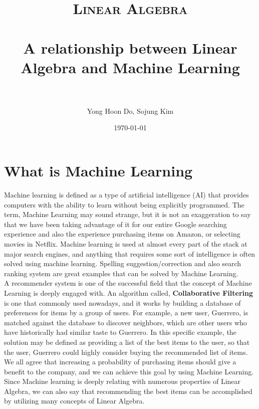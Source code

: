 \documentclass[paper=a4, fontsize=11pt]{scrartcl} %
\title{
\normalfont \normalsize
\textsc{Linear Algebra} \\ [25pt] %
\horrule{0.5pt} \\[0.4cm] %
\huge A relationship between Linear Algebra and Machine Learning \\
\horrule{2pt} \\[0.5cm] %
}
\author{Yong Hoon Do, Sojung Kim} %
\date{\normalsize\today} %
\numberwithin{equation}{section} %
\numberwithin{figure}{section} %
\numberwithin{table}{section} %
\begin{document}
\maketitle %

\section{What is Machine Learning}

Machine learning is defined as a type of artificial intelligence (AI) that provides computers
with the ability to learn without being explicitly programmed.
The term, Machine Learning may sound strange, but it is not an exaggeration to say that
we have been taking advantage of it for our entire Google searching experience
and also the experience purchasing items on Amazon, or selecting movies in Netflix.
Machine learning is used at almost every part of the stack at major search engines, and
anything that requires some sort of intelligence is often solved using machine learning.
Spelling suggestion/correction and also search ranking system are great examples that can be solved by Machine Learning. \\

A recommender system is one of the successful field that the concept of Machine Learning is deeply engaged with.
An algorithm called, \textbf{Collaborative Filtering} is one that commonly used nowadays,
and it works by building a database of preferences for items by a group of users.
For example, a new user, Guerrero, is matched against the database to discover neighbors,
which are other users who have historically had similar taste to Guerrero.
In this specific example, the solution may be defined as providing
a list of the best items to the user, so that the user, Guerrero could highly consider buying the recommended list of items.
We all agree that increasing a probability of purchasing items should give a benefit to the company, and
we can achieve this goal by using Machine Learning. \\

Since Machine learning is deeply relating with numerous properties of Linear Algebra,
we can also say that recommending the best items can be accomplished by utilizing many concepts of Linear Algebra.

\end{document}
